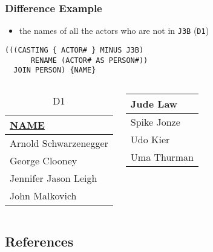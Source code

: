 \documentclass[dvipsnames]{beamer}
\theoremstyle{plain}
\begin{document}
\begin{frame}[fragile]
  \frametitle{Difference Example}

  \begin{example}
    \begin{itemize}
      \item the names of all the actors who are not in \texttt{J3B} (\texttt{D1})
    \end{itemize}

    \begin{lstlisting}
(((CASTING { ACTOR# } MINUS J3B)
      RENAME (ACTOR# AS PERSON#))
  JOIN PERSON) {NAME}
    \end{lstlisting}

    \pause
    \vspace{-10pt}
    \begin{columns}[b]
      \begin{tiny}
      \begin{table}
        \caption{D1}
        \begin{tabular}{|l|}\hline
\underline{NAME}     \\[2pt]\hline\hline
Arnold Schwarzenegger\\\hline
George Clooney       \\\hline
Jennifer Jason Leigh \\\hline
John Malkovich       \\\hline
        \end{tabular}
      \end{table}
      \end{tiny}

      \begin{tiny}
      \begin{table}
        \begin{tabular}{|l|}\hline
Jude Law             \\\hline
Spike Jonze          \\\hline
Udo Kier             \\\hline
Uma Thurman          \\\hline
        \end{tabular}
      \end{table}
      \end{tiny}
    \end{columns}
  \end{example}
\end{frame}

\subsection*{References}
\end{document}
